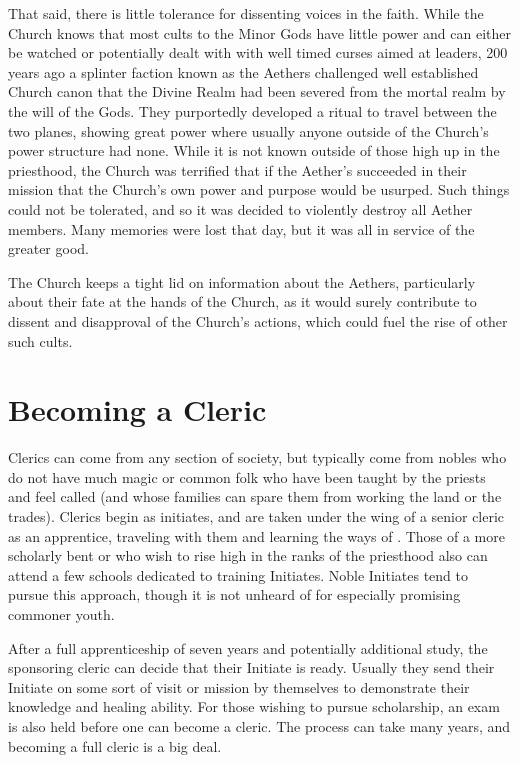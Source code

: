 \documentclass[blue]{GL2020}
\begin{document}
That said, there is little tolerance for dissenting voices in the faith. While the Church knows that most cults to the Minor Gods have little power and can either be watched or potentially dealt with with well timed curses aimed at leaders, 200 years ago a splinter faction known as the Aethers challenged well established Church canon that the Divine Realm had been severed from the mortal realm by the will of the Gods. They purportedly developed a ritual to travel between the two planes, showing great power where usually anyone outside of the Church’s power structure had none. While it is not known outside of those high up in the priesthood, the Church was terrified that if the Aether’s succeeded in their mission that the Church’s own power and purpose would be usurped. Such things could not be tolerated, and so it was decided to violently destroy all Aether members. Many memories were lost that day, but it was all in service of the greater good. 

The Church keeps a tight lid on information about the Aethers, particularly about their fate at the hands of the Church, as it would surely contribute to dissent and disapproval of the Church's actions, which could fuel the rise of other such cults.

\section*{Becoming a Cleric}

Clerics can come from any section of society, but typically come from nobles who do not have much magic or common folk who have been taught by the priests and feel called (and whose families can spare them from working the land or the trades). Clerics begin as initiates, and are taken under the wing of a senior cleric as an apprentice, traveling with them and learning the ways of \cFarmGod{}. Those of a more scholarly bent or who wish to rise high in the ranks of the priesthood also can attend a few schools dedicated to training Initiates. Noble Initiates tend to pursue this approach, though it is not unheard of for especially promising commoner youth.  

After a full apprenticeship of seven years and potentially additional study, the sponsoring cleric can decide that their Initiate is ready. Usually they send their Initiate on some sort of visit or mission by themselves to demonstrate their knowledge and healing ability. For those wishing to pursue scholarship, an exam is also held before one can become a cleric. The process can take many years, and becoming a full cleric is a big deal. 
\end{document}
